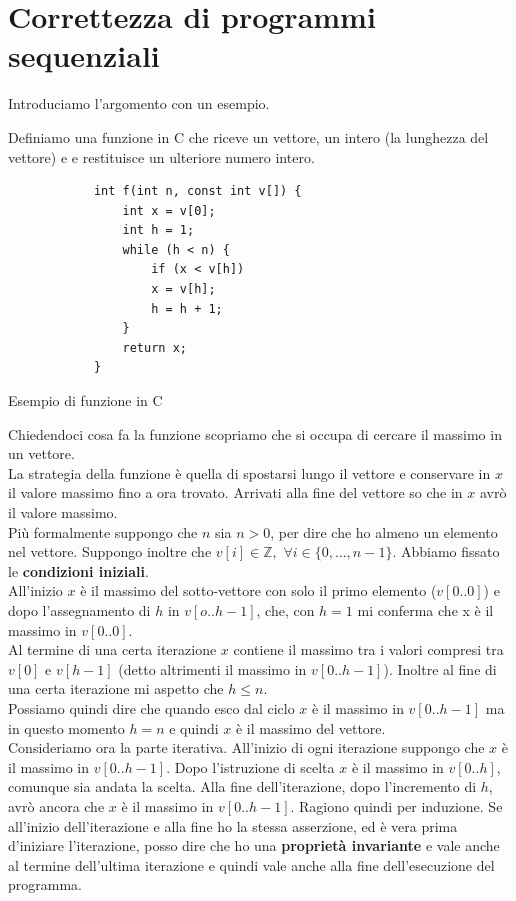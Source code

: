 \chapter{Correttezza di programmi sequenziali}
\label{Capitolo 3}
Introduciamo l'argomento con un esempio.
\begin{esempio}
	Definiamo una funzione in C che riceve un vettore, un intero (la lunghezza del vettore) e
	e restituisce un ulteriore numero intero.
	\begin{listing}[ht]
		\begin{verbatim}
			int f(int n, const int v[]) {
				int x = v[0];
				int h = 1;
				while (h < n) {
					if (x < v[h])
					x = v[h];        
					h = h + 1;
				}
				return x;
			}
		\end{verbatim}
		\caption{Esempio di funzione in C}
		\label{listing:1}
	\end{listing}
	Chiedendoci cosa fa la funzione scopriamo che si occupa di cercare il massimo in
	un vettore.\\
	La strategia della funzione è quella di spostarsi lungo il vettore e
	conservare in $x$ il valore massimo fino a ora trovato. Arrivati alla fine
	del vettore so che in $x$ avrò il valore massimo.\\
	Più formalmente suppongo che $n$ sia $n > 0$, per dire che ho almeno un
	elemento nel vettore. Suppongo inoltre che $v[i]\in\mathbb{Z},\,\,\forall i\in
	\{0,\ldots, n-1\}$. Abbiamo fissato le \textbf{condizioni iniziali}.\\
	All'inizio $x$ è il massimo del sotto-vettore con solo il primo elemento
	($v[0..0]$) e dopo l'assegnamento di $h$ in $v[o..h-1]$, che, con $h=1$ mi
	conferma che x è il massimo in $v[0..0]$. \\
	Al termine di una certa iterazione $x$ contiene il massimo 
	tra i valori compresi tra $v[0]$ e $v[h-1]$ (detto altrimenti il massimo in
	$v[0..h-1]$). Inoltre al fine di una certa iterazione mi aspetto che $h\leq
	n$.\\
	Possiamo quindi dire che quando esco dal ciclo $x$ è il massimo in $v[0..h-1]$
	ma in questo momento $h=n$ e quindi $x$ è il massimo del vettore.\\
	Consideriamo ora la parte iterativa. All'inizio di ogni iterazione suppongo
	che $x$ è il massimo in $v[0..h-1]$. Dopo l'istruzione di scelta $x$ è il
	massimo in $v[0..h]$, comunque sia andata la scelta. Alla fine
	dell'iterazione, dopo l'incremento di $h$, avrò ancora che $x$ è il massimo in
	$v[0..h-1]$. Ragiono quindi per induzione. Se all'inizio dell'iterazione e
	alla fine ho la stessa asserzione, ed è vera prima d'iniziare l'iterazione,
	posso dire che ho una \textbf{proprietà invariante} e vale anche al termine
	dell'ultima iterazione e quindi vale anche alla fine dell'esecuzione del
	programma. 
\end{esempio}
